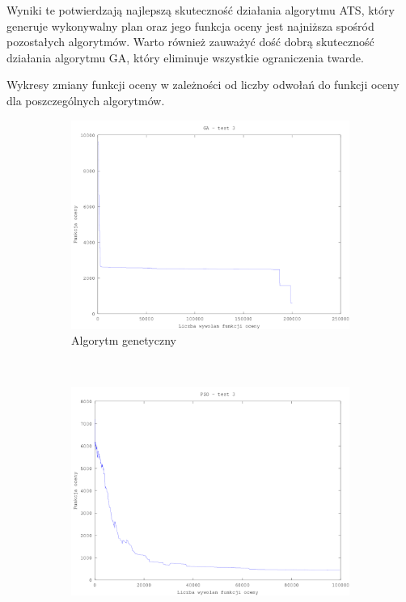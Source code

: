 Wyniki te potwierdzają najlepszą skuteczność działania algorytmu ATS, który generuje wykonywalny plan oraz jego funkcja oceny jest najniższa spośród pozostałych algorytmów. Warto również zauważyć dość dobrą skuteczność działania algorytmu GA, który eliminuje wszystkie ograniczenia twarde.
\par  Wykresy zmiany funkcji oceny w zależności od liczby odwołań do funkcji oceny dla poszczególnych algorytmów.

\begin{figure}[H]
        \centering
\begin{subfigure}[b]{0.5\textwidth}
                \includegraphics[width=\textwidth]{ga_test_3.png}
                \caption{Algorytm genetyczny}
        \end{subfigure}%
        ~ %
        \begin{subfigure}[b]{0.5\textwidth}
                \includegraphics[width=\textwidth]{pso_3.png}

\end{subfigure}
\end{figure}
